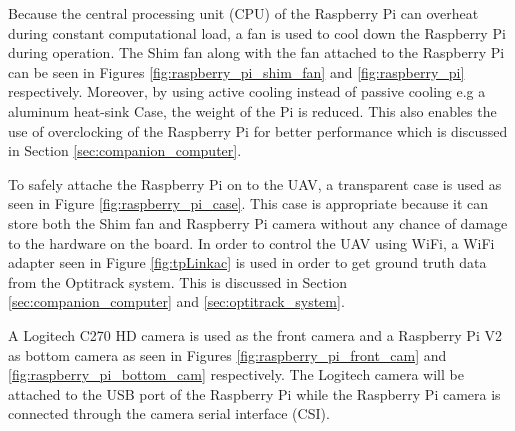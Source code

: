 \documentclass[../Head/report.tex]{subfiles}
\begin{document}
Because the central processing unit (CPU) of the Raspberry Pi can overheat during constant computational load, a fan is used to cool down the Raspberry Pi during operation. The Shim fan along with the fan attached to the Raspberry Pi can be seen in Figures \ref{fig:raspberry_pi_shim_fan} and \ref{fig:raspberry_pi} respectively. Moreover, by using active cooling instead of passive cooling e.g a aluminum heat-sink Case, the weight of the Pi is reduced. This also enables the use of overclocking of the Raspberry Pi for better performance which is discussed in Section \ref{sec:companion_computer}.

To safely attache the Raspberry Pi on to the UAV, a transparent case is used as seen in Figure \ref{fig:raspberry_pi_case}. This case is appropriate because it can store both the Shim fan and Raspberry Pi camera without any chance of damage to the hardware on the board. In order to control the UAV using WiFi, a WiFi adapter seen in Figure \ref{fig:tpLinkac} is used in order to get ground truth data from the Optitrack system. This is discussed in Section \ref{sec:companion_computer} and \ref{sec:optitrack_system}.

A Logitech C270 HD camera is used as the front camera and a Raspberry Pi V2 as bottom camera as seen in Figures \ref{fig:raspberry_pi_front_cam} and \ref{fig:raspberry_pi_bottom_cam} respectively. The Logitech camera will be attached to the USB port of the Raspberry Pi while the Raspberry Pi camera is connected through the camera serial interface (CSI). 
\end{document}

